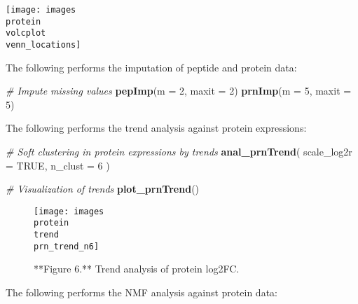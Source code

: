 \documentclass[]{article}
\newenvironment{Shaded}{\begin{snugshade}}{\end{snugshade}}
\newcommand{\CommentTok}[1]{\textcolor[rgb]{0.56,0.35,0.01}{\textit{#1}}}
\newcommand{\DataTypeTok}[1]{\textcolor[rgb]{0.13,0.29,0.53}{#1}}
\newcommand{\DecValTok}[1]{\textcolor[rgb]{0.00,0.00,0.81}{#1}}
\newcommand{\KeywordTok}[1]{\textcolor[rgb]{0.13,0.29,0.53}{\textbf{#1}}}
\newcommand{\NormalTok}[1]{#1}
\newcommand{\OtherTok}[1]{\textcolor[rgb]{0.56,0.35,0.01}{#1}}
\begin{document}
\texttt{[image: images\\protein\\volcplot\\venn\_locations]}

The following performs the imputation of peptide and protein data:

\begin{Shaded}
\begin{Highlighting}[]
\CommentTok{# Impute missing values}
\KeywordTok{pepImp}\NormalTok{(}\DataTypeTok{m =} \DecValTok{2}\NormalTok{, }\DataTypeTok{maxit =} \DecValTok{2}\NormalTok{)}
\KeywordTok{prnImp}\NormalTok{(}\DataTypeTok{m =} \DecValTok{5}\NormalTok{, }\DataTypeTok{maxit =} \DecValTok{5}\NormalTok{)}
\end{Highlighting}
\end{Shaded}

The following performs the trend analysis against protein expressions:

\begin{Shaded}
\begin{Highlighting}[]
\CommentTok{# Soft clustering in protein expressions by trends}
\KeywordTok{anal_prnTrend}\NormalTok{(}
  \DataTypeTok{scale_log2r =} \OtherTok{TRUE}\NormalTok{, }
  \DataTypeTok{n_clust =} \DecValTok{6}
\NormalTok{)}

\CommentTok{# Visualization of trends}
\KeywordTok{plot_prnTrend}\NormalTok{()}
\end{Highlighting}
\end{Shaded}

\begin{figure}

\texttt{[image: images\\protein\\trend\\prn\_trend\_n6]} \hfill{}

\caption{**Figure 6.** Trend analysis of protein log2FC.}\label{fig:Protein_trends plots}
\end{figure}

The following performs the NMF analysis against protein data:
\end{document}
